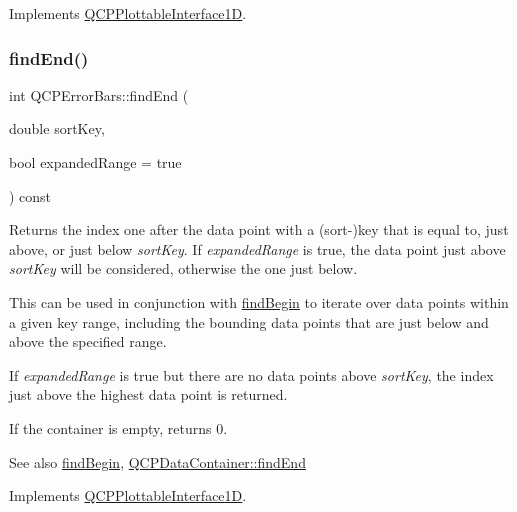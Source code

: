 Implements \hyperlink{class_q_c_p_plottable_interface1_d_a5deced1016bc55a41a2339619045b295}{Q\+C\+P\+Plottable\+Interface1D}.

\mbox{\label{class_q_c_p_error_bars_a64629f13bb290d41dd8f1b37346bfdd4}} 
\subsubsection{\texorpdfstring{find\+End()}{findEnd()}\hspace{0.1cm}{\footnotesize\ttfamily [2/2]}}
{\footnotesize\ttfamily int Q\+C\+P\+Error\+Bars\+::find\+End (\begin{DoxyParamCaption}\item[{double}]{sort\+Key,  }\item[{bool}]{expanded\+Range = {\ttfamily true} }\end{DoxyParamCaption}) const\hspace{0.3cm}{\ttfamily [virtual]}}

Returns the index one after the data point with a (sort-\/)key that is equal to, just above, or just below {\itshape sort\+Key}. If {\itshape expanded\+Range} is true, the data point just above {\itshape sort\+Key} will be considered, otherwise the one just below.

This can be used in conjunction with \hyperlink{class_q_c_p_error_bars_a5c74b510f1d7254263ec18cd3a359a07}{find\+Begin} to iterate over data points within a given key range, including the bounding data points that are just below and above the specified range.

If {\itshape expanded\+Range} is true but there are no data points above {\itshape sort\+Key}, the index just above the highest data point is returned.

If the container is empty, returns 0.

\begin{DoxySeeAlso}{See also}
\hyperlink{class_q_c_p_error_bars_a5c74b510f1d7254263ec18cd3a359a07}{find\+Begin}, \hyperlink{class_q_c_p_data_container_afb8b8f23cc2b7234a793a25ce79fe48f}{Q\+C\+P\+Data\+Container\+::find\+End} 
\end{DoxySeeAlso}


Implements \hyperlink{class_q_c_p_plottable_interface1_d_a5deced1016bc55a41a2339619045b295}{Q\+C\+P\+Plottable\+Interface1D}.


